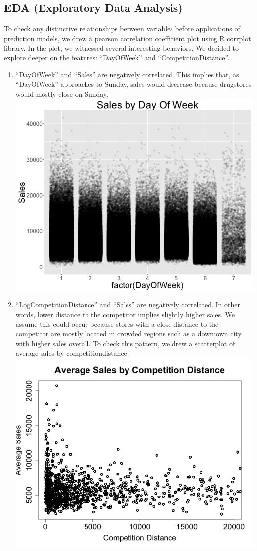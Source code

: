 \documentclass[letterpaper,twocolumn,11pt]{article}
\begin{document}
\subsection{EDA (Exploratory Data Analysis)}
To check any distinctive relationships between variables before applications of prediction models, we drew a pearson correlation coefficient plot using R corrplot library. In the plot, we witnessed several interesting behaviors. We decided to explore deeper on the features: ``DayOfWeek'' and ``CompetitionDistance''.
\begin{enumerate}
\item ``DayOfWeek'' and ``Sales'' are negatively correlated. This implies that, as ``DayOfWeek'' approaches to Sunday, sales would decrease because drugstores would mostly close on Sunday.
  \includegraphics[scale=0.3]{img/sales_dayofweek.png}
\item ``LogCompetitionDistance'' and ``Sales'' are negatively correlated. In other words, lower distance to the competitor implies slightly higher sales. We assume this could occur because stores with a close distance to the competitor are mostly located in crowded regions such as a downtown city with higher sales overall. To check this pattern, we drew a scatterplot of average sales by competitiondistance.
  \includegraphics[scale=0.32]{img/compDist.png}

\end{enumerate}
\end{document}

